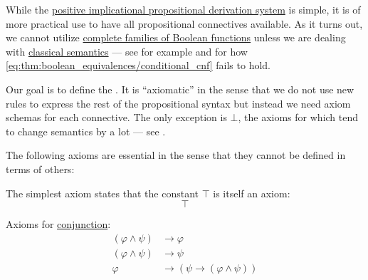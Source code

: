 \begin{definition}\label{def:minimal_propositional_axiomatic_derivation_system}
  While the \hyperref[def:positive_implicational_propositional_derivation_system]{positive implicational propositional derivation system} is simple, it is of more practical use to have all propositional connectives available. As it turns out, we cannot utilize \hyperref[ex:posts_completeness_theorem]{complete families of Boolean functions} unless we are dealing with \hyperref[def:propositional_semantics]{classical semantics} --- see for example  and  for how \cref{eq:thm:boolean_equivalences/conditional_cnf} fails to hold.

  Our goal is to define the . It is \enquote{axiomatic} in the sense that we do not use new rules to express the rest of the propositional syntax but instead we need axiom schemas for each connective. The only exception is \hyperref[def:propositional_language/constants/top]{\( \bot \)}, the axioms for which tend to change semantics by a lot --- see .

  The following axioms are essential in the sense that they cannot be defined in terms of others:
  \begin{thmenum}[series=def:minimal_propositional_axiomatic_derivation_system]
     The simplest axiom states that the constant \hyperref[def:propositional_language/constants/top]{\( \top \)} is itself an axiom:
    \begin{equation}\label{def:minimal_propositional_axiomatic_derivation_system/top_intro}
      \top
    \end{equation}

     Axioms for \hyperref[def:propositional_language/connectives/conjunction]{conjunction}:
    \begin{align}
      (\varphi \wedge \psi) &\rightarrow \varphi \label{def:minimal_propositional_axiomatic_derivation_system/and_elim_left} \\
      (\varphi \wedge \psi) &\rightarrow \psi \label{def:minimal_propositional_axiomatic_derivation_system/and_elim_right} \\
      \varphi               &\rightarrow (\psi \rightarrow (\varphi \wedge \psi)) \label{def:minimal_propositional_axiomatic_derivation_system/and_intro}
    \end{align}


\end{thmenum}
\end{definition}
